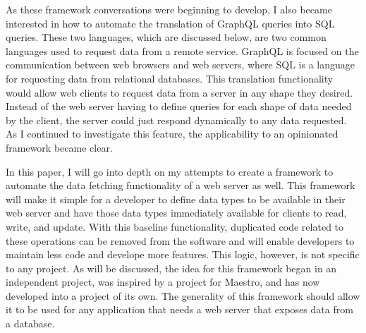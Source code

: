 As these framework conversations were beginning to develop, I also became interested in how to automate the translation of GraphQL queries into SQL queries.  These two languages, which are discussed below, are two common languages used to request data from a remote service.  GraphQL is focused on the communication between web browsers and web servers, where SQL is a language for requesting data from relational databases.  This translation functionality would allow web clients to request data from a server in any shape they desired.  Instead of the web server having to define queries for each shape of data needed by the client, the server could just respond dynamically to any data requested.  As I continued to investigate this feature, the applicability to an opinionated framework became clear.

In this paper, I will go into depth on my attempts to create a framework to automate the data fetching functionality of a web server as well. This framework will make it simple for a developer to define data types to be available in their web server and have those data types immediately available for clients to read, write, and update.  With this baseline functionality, duplicated code related to these operations can be removed from the software and will enable developers to maintain less code and develope more features.  This logic, however, is not specific to any project.  As will be discussed, the idea for this framework began in an independent project, was inspired by a project for Maestro, and has now developed into a project of its own.  The generality of this framework should allow it to be used for any application that needs a web server that exposes data from a database.